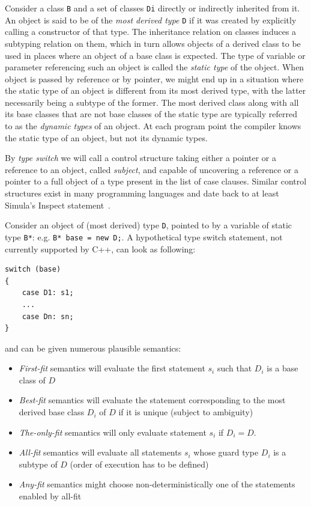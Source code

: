 \documentclass[preprint]{sigplanconf}
\makeatletter
\DeclareRobustCommand{\code}[1]{{\lstinline[breaklines=false,escapechar=@]{#1}}}
\makeatother
\begin{document}
Consider a class \code{B} and a set of classes \code{Di} directly or indirectly 
inherited from it. An object is said to be of the \emph{most derived type} 
\code{D} if it was created by explicitly calling a constructor of that type.
The inheritance relation on classes induces a subtyping relation on them, which in 
turn allows objects of a derived class to be used in places where an object of a 
base class is expected. The type of variable or parameter referencing such an
object is called the \emph{static type} of the object. When object is passed by 
reference or by pointer, we might end up in a situation where the static type of an 
object is different from its most derived type, with the latter necessarily 
being a subtype of the former. The most derived class along with all its base classes 
that are not base classes of the static type are typically referred to as the 
\emph{dynamic types} of an object. At each program point the compiler knows the 
static type of an object, but not its dynamic types.

By \emph{type switch} we will call a control structure taking either a pointer 
or a reference to an object, called \emph{subject}, and capable of uncovering a 
reference or a pointer to a full object of a type present in the list of case 
clauses. Similar control structures exist in many programming languages and 
date back to at least Simula's Inspect statement~\cite{Simula67}.

Consider an object of (most derived) type \code{D}, pointed to by a variable of 
static type \code{B*}: e.g. \code{B* base = new D;}. A hypothetical type switch 
statement, not currently supported by C++, can look as following:

\begin{lstlisting}
switch (base)
{
    case D1: s1;
    ...
    case Dn: sn;
}
\end{lstlisting}

\noindent and can be given numerous plausible semantics:

\begin{itemize}
\setlength{\itemsep}{0pt}
\setlength{\parskip}{0pt}
\item \emph{First-fit} semantics will evaluate the first statement $s_i$ such 
      that $D_i$ is a base class of $D$
\item \emph{Best-fit} semantics will evaluate the statement corresponding to the 
      most derived base class $D_i$ of $D$ if it is unique (subject to 
      ambiguity)
\item \emph{The-only-fit} semantics will only evaluate statement $s_i$ if $D_i=D$.
\item \emph{All-fit} semantics will evaluate all statements $s_i$ whose guard 
      type $D_i$ is a subtype of $D$ (order of execution has to be defined)
\item \emph{Any-fit} semantics might choose non-deterministically one of the 
      statements enabled by all-fit
\end{itemize}
\end{document}
